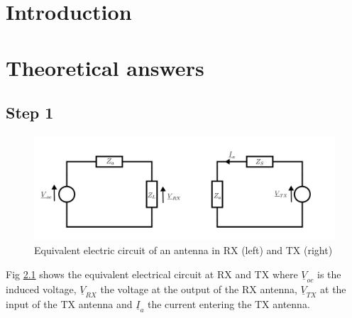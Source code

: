 \documentclass[10pt,a4paper]{ULBreport}
\begin{document}
 





\chapter{Introduction}

\chapter{Theoretical answers}

\section{Step 1}

\begin{figure}[H]
    \centering
    \includegraphics[width=1\textwidth]{circuit.png}
    \caption{Equivalent electric circuit of an antenna in RX (left) and TX (right)}
    \label{fig:equivalent_electrical_circuit}
\end{figure}

Fig \ref{fig:equivalent_electrical_circuit} shows the equivalent electrical circuit at RX and TX where $\underline{V}_{oc}$ is the induced voltage, $\underline{V}_{RX}$ the voltage at the output of the RX antenna, $\underline{V}_{TX}$ at the input of the TX antenna and $\underline{I}_{a}$ the current entering the TX antenna.\\
\end{document}
